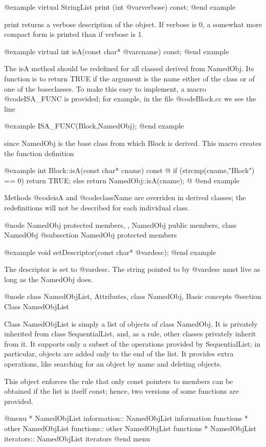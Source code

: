 @example
virtual StringList print (int @var{verbose}) const;
@end example

print returns a verbose description of the object.  If verbose is 0, a
somewhat more compact form is printed than if verbose is 1.

@example
virtual int isA(const char* @var{cname}) const;
@end example

The isA method should be redefined for all classed derived from
NamedObj.  Its function is to return TRUE if the argument is the name
either of the class or of one of the baseclasses.  To make this easy to
implement, a macro @code{ISA_FUNC} is provided; for example, in the
file @code{Block.cc} we see the line

@example
ISA_FUNC(Block,NamedObj);
@end example

since NamedObj is the base class from which Block is derived.  This
macro creates the function definition

@example
int Block::isA(const char* cname) const @{
        if (strcmp(cname,"Block") == 0) return TRUE;
        else return NamedObj::isA(cname);
@}
@end example

Methods @code{isA} and @code{className} are overriden in derived
classes; the redefinitions will not be described for each individual
class.

@node NamedObj protected members,  , NamedObj public members, class NamedObj
@subsection NamedObj protected members

@example
void setDescriptor(const char* @var{desc});
@end example

The descriptor is set to @var{desc}.  The string pointed to by
@var{desc} must live as long as the NamedObj does.

@node class NamedObjList, Attributes, class NamedObj, Basic concepts
@section Class NamedObjList

Class NamedObjList is simply a list of objects of class NamedObj.
It is privately inherited from class SequentialList, and, as a rule,
other classes privately inherit from it.  It supports only a subset
of the operations provided by SequentialList; in particular, objects
are added only to the end of the list.  It provides extra operations,
like searching for an object by name and deleting objects.

This object enforces the rule that only const pointers to members can
be obtained if the list is itself const; hence, two versions of some
functions are provided.

@menu
* NamedObjList information::    NamedObjList information functions
* other NamedObjList functions::  other NamedObjList functions
* NamedObjList iterators::      NamedObjList iterators
@end menu

